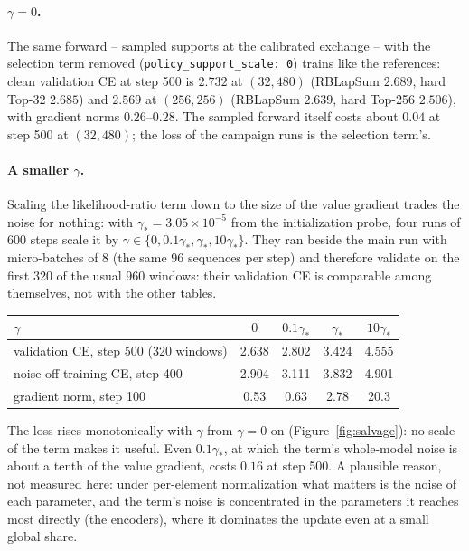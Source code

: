 \documentclass[11pt,a4paper]{article}
\newcommand{\code}[1]{\texttt{#1}}
\begin{document}
\paragraph{$\gamma = 0$.} The same forward -- sampled supports at the calibrated
exchange -- with the selection term removed (\code{policy\_support\_scale: 0})
trains like the references: clean validation CE at step 500 is $2.732$ at
$(32, 480)$ (RBLapSum $2.689$, hard Top-32 $2.685$) and $2.569$ at $(256, 256)$
(RBLapSum $2.639$, hard Top-256 $2.506$), with gradient norms $0.26$--$0.28$.
The sampled forward itself costs about $0.04$ at step 500 at $(32, 480)$; the
loss of the campaign runs is the selection term's.

\paragraph{A smaller $\gamma$.} Scaling the likelihood-ratio term down to the
size of the value gradient trades the noise for nothing: with $\gamma_* = 3.05
\times 10^{-5}$ from the initialization probe, four runs of 600 steps scale it
by $\gamma \in \{0, 0.1\gamma_*, \gamma_*, 10\gamma_*\}$. They ran beside the
main run with micro-batches of 8 (the same 96 sequences per step) and therefore
validate on the first 320 of the usual 960 windows: their validation CE is
comparable among themselves, not with the other tables.

\begin{center}\small
\begin{tabular}{lcccc}
\toprule
$\gamma$ & $0$ & $0.1\gamma_*$ & $\gamma_*$ & $10\gamma_*$ \\
\midrule
validation CE, step 500 (320 windows) & 2.638 & 2.802 & 3.424 & 4.555 \\
noise-off training CE, step 400 & 2.904 & 3.111 & 3.832 & 4.901 \\
gradient norm, step 100 & 0.53 & 0.63 & 2.78 & 20.3 \\
\bottomrule
\end{tabular}
\end{center}

The loss rises monotonically with $\gamma$ from $\gamma = 0$ on
(Figure~\ref{fig:salvage}): no scale of the term makes it useful. Even $0.1\gamma_*$, at which the term's whole-model noise
is about a tenth of the value gradient, costs $0.16$ at step 500. A plausible
reason, not measured here: under per-element normalization what matters is the
noise of each parameter, and the term's noise is concentrated in the parameters
it reaches most directly (the encoders), where it dominates the update even at a
small global share.
\end{document}
